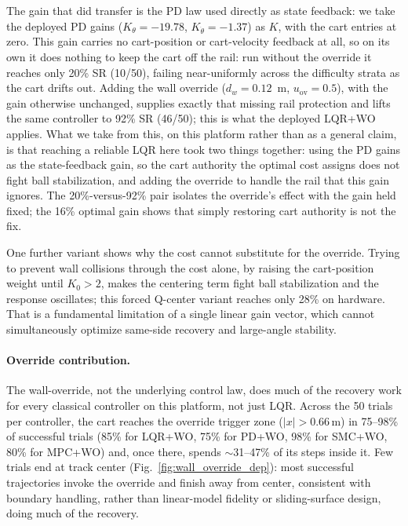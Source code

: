 The gain that did transfer is the PD law used directly as state feedback: we
take the deployed PD gains ($K_\theta = -19.78$, $K_{\dot\theta} = -1.37$) as
$K$, with the cart entries at zero. This gain carries no cart-position or
cart-velocity feedback at all, so on its own it does nothing to keep the cart
off the rail: run without the override it reaches only 20\% SR (10/50), failing
near-uniformly across the difficulty strata as the cart drifts out. Adding the
wall override ($d_w=0.12$~m, $u_\text{ov}=0.5$), with the gain otherwise
unchanged, supplies exactly that missing rail protection and lifts the same
controller to 92\% SR (46/50); this is what the deployed LQR+WO applies.
What we take from this, on this platform rather than as a general claim, is that
reaching a reliable LQR here took two things together: using the PD gains as the
state-feedback gain, so the cart authority the optimal cost assigns does not
fight ball stabilization, and adding the override to handle the rail that this
gain ignores. The 20\%-versus-92\% pair isolates the override's effect with the
gain held fixed; the 16\% optimal gain shows that simply restoring cart
authority is not the fix.

One further variant shows why the cost cannot substitute for the override.
Trying to prevent wall collisions through the cost alone, by raising the
cart-position weight until $K_0 > 2$, makes the centering term fight ball
stabilization and the response oscillates; this forced Q-center variant
reaches only 28\% on hardware. That is a fundamental limitation of a single
linear gain vector, which cannot simultaneously optimize same-side recovery
and large-angle stability.

\paragraph{Override contribution.}
The wall-override, not the underlying control law, does much of the
recovery work for every classical controller on this platform, not just
LQR. Across the 50 trials per controller, the cart reaches the override
trigger zone ($|x| > 0.66$\,m) in 75--98\% of successful trials (85\%
for LQR+WO, 75\% for PD+WO, 98\% for SMC+WO, 80\% for MPC+WO) and, once
there, spends $\sim$31--47\% of its steps inside it. Few trials end at
track center (Fig.~\ref{fig:wall_override_dep}): most successful
trajectories invoke the override and finish away from center, consistent
with boundary handling, rather than linear-model fidelity or
sliding-surface design, doing much of the recovery.

